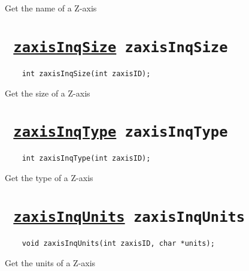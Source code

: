 Get the name of a Z-axis
\ifpdfoutput{}{(\ref{zaxisInqName})}


\section*{\tt 
\ifpdf
\hyperref[zaxisInqSize]{zaxisInqSize}
\else
zaxisInqSize
\fi
}
\begin{verbatim}
    int zaxisInqSize(int zaxisID);
\end{verbatim}

Get the size of a Z-axis
\ifpdfoutput{}{(\ref{zaxisInqSize})}


\section*{\tt 
\ifpdf
\hyperref[zaxisInqType]{zaxisInqType}
\else
zaxisInqType
\fi
}
\begin{verbatim}
    int zaxisInqType(int zaxisID);
\end{verbatim}

Get the type of a Z-axis
\ifpdfoutput{}{(\ref{zaxisInqType})}


\section*{\tt 
\ifpdf
\hyperref[zaxisInqUnits]{zaxisInqUnits}
\else
zaxisInqUnits
\fi
}
\begin{verbatim}
    void zaxisInqUnits(int zaxisID, char *units);
\end{verbatim}

Get the units of a Z-axis
\ifpdfoutput{}{(\ref{zaxisInqUnits})}
